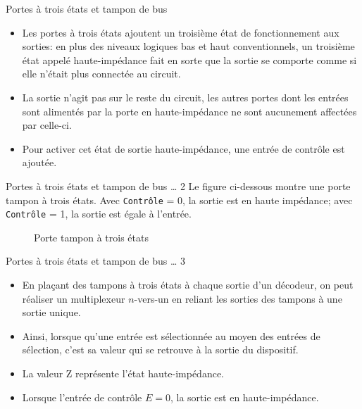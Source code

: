 \documentclass[presentation]{beamer}
\begin{document}
\begin{frame}[label={sec:org659b48f}]{Portes à trois états et tampon de bus}
\begin{itemize}
\item Les portes à trois états ajoutent un troisième état de fonctionnement aux sorties: en plus des niveaux logiques bas et haut conventionnels, un troisième état appelé \alert{haute-impédance} fait en sorte que la sortie se comporte comme si elle n'était plus connectée au circuit.

\item La sortie n'agit pas sur le reste du circuit, les autres portes dont les entrées sont alimentés par la porte en haute-impédance ne sont aucunement affectées par celle-ci.

\item Pour activer cet état de sortie haute-impédance, une entrée de contrôle est ajoutée.
\end{itemize}
\end{frame}

\begin{frame}[label={sec:orgee9cb71},fragile]{Portes à trois états et tampon de bus \ldots{} 2}
 Le figure ci-dessous montre une porte tampon à trois états. Avec
\texttt{Contrôle} = 0, la sortie est en haute impédance; avec  \texttt{Contrôle} = 1,
la sortie est égale à l'entrée.

\begin{figure}[htbp]
\centering

\caption{\label{fig:org5b91c4d}Porte tampon à trois états}
\end{figure}
\end{frame}

\begin{frame}[label={sec:orgb12f2f3}]{Portes à trois états et tampon de bus \ldots{} 3}
\begin{itemize}
\item En plaçant des tampons à trois états à chaque sortie d'un décodeur, on peut réaliser un multiplexeur \(n\)-vers-un en reliant les sorties des tampons à une sortie unique.

\item Ainsi, lorsque qu'une entrée est sélectionnée au moyen des entrées de sélection, c'est sa valeur qui se retrouve à la sortie du dispositif.

\item La valeur Z représente l'état haute-impédance.

\item Lorsque l'entrée de contrôle \(E = 0\), la sortie est en haute-impédance.
\end{itemize}
\end{frame}
\end{document}
